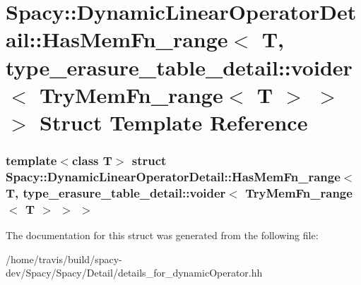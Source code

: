 \hypertarget{structSpacy_1_1DynamicLinearOperatorDetail_1_1HasMemFn__range_3_01T_00_01type__erasure__table__d4018ff0179822a0cb55844f904c5d3a2}{\section{\-Spacy\-:\-:\-Dynamic\-Linear\-Operator\-Detail\-:\-:\-Has\-Mem\-Fn\-\_\-range$<$ \-T, type\-\_\-erasure\-\_\-table\-\_\-detail\-:\-:voider$<$ \-Try\-Mem\-Fn\-\_\-range$<$ \-T $>$ $>$ $>$ \-Struct \-Template \-Reference}
\label{structSpacy_1_1DynamicLinearOperatorDetail_1_1HasMemFn__range_3_01T_00_01type__erasure__table__d4018ff0179822a0cb55844f904c5d3a2}
}
\subsubsection*{template$<$class T$>$ struct Spacy\-::\-Dynamic\-Linear\-Operator\-Detail\-::\-Has\-Mem\-Fn\-\_\-range$<$ T, type\-\_\-erasure\-\_\-table\-\_\-detail\-::voider$<$ Try\-Mem\-Fn\-\_\-range$<$ T $>$ $>$ $>$}



\-The documentation for this struct was generated from the following file\-:\begin{DoxyCompactItemize}
\item 
/home/travis/build/spacy-\/dev/\-Spacy/\-Spacy/\-Detail/details\-\_\-for\-\_\-dynamic\-Operator.\-hh\end{DoxyCompactItemize}
